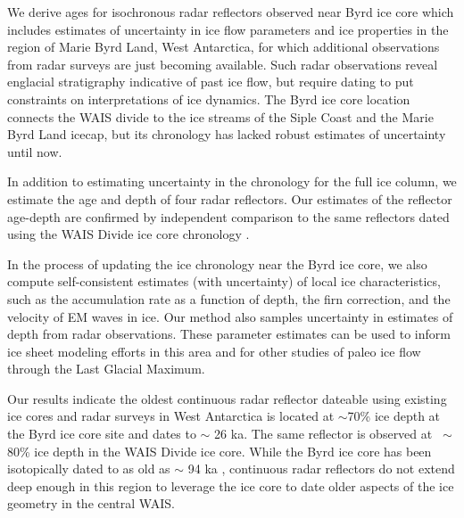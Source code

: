 

We derive ages for isochronous radar reflectors observed near Byrd ice core which includes estimates of uncertainty in ice flow parameters and ice properties in the region of Marie Byrd Land, West Antarctica, for which additional observations from radar surveys are just becoming available. Such radar observations reveal englacial stratigraphy indicative of past ice flow, but require dating to put constraints on interpretations of ice dynamics. The Byrd ice core location connects the WAIS divide to the ice streams of the Siple Coast and the Marie Byrd Land icecap, but its chronology has lacked robust estimates of uncertainty until now. 

In addition to estimating uncertainty in the chronology for the full ice column, we estimate the age and depth of four radar reflectors. Our estimates of the reflector age-depth are confirmed by independent comparison to the same reflectors dated using the WAIS Divide ice core chronology \citep{buizert2015}. 

In the process of updating the ice chronology near the Byrd ice core, we also compute self-consistent estimates (with uncertainty) of local ice characteristics, such as the accumulation rate as a function of depth, the firn correction, and the velocity of EM waves in ice. Our method also samples uncertainty in estimates of depth from radar observations. These parameter estimates can be used to inform ice sheet modeling efforts in this area and for other studies of paleo ice flow through the Last Glacial Maximum. 

Our results indicate the oldest continuous radar reflector dateable using existing ice cores and radar surveys in West Antarctica is located at $\sim$70\% ice depth at the Byrd ice core site and dates to $\sim$ 26 ka. The same reflector is observed at $~\sim$80\% ice depth in the WAIS Divide ice core. While the Byrd ice core has been isotopically dated to as old as $\sim$ 94 ka \citep{blunier2001}, continuous radar reflectors do not extend deep enough in this region to leverage the ice core to date older aspects of the ice geometry in the central WAIS.




